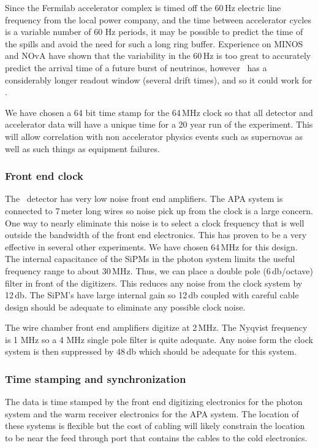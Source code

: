 Since the Fermilab accelerator complex is timed off the 60\,Hz electric
line frequency from the local power company, and the time between
accelerator cycles is a variable number of 60 Hz periods, it may be
possible to predict the time of the spills and avoid the need for such
a long ring buffer.  Experience on MINOS and NOvA have shown that the
variability in the 60\,Hz is too great to accurately predict the
arrival time of a future burst of neutrinos, however \LBNE\ has a
considerably longer readout window (several drift times), and so it
could work for \LBNE.

We have chosen a 64 bit time stamp for the 64\,MHz clock so that all
detector and accelerator data will have a unique time for a 20 year
run of the experiment.  This will allow correlation with non
accelerator physics events such as supernovas as well as such things
as equipment failures.

\subsubsection{Front end clock}

The \LBNE\ detector has very low noise front end amplifiers.  The APA system
is connected to 7\,meter long wires so noise pick up from the clock is
a large concern.  One way to nearly eliminate this noise is to select
a clock frequency that is well outside the bandwidth of the front end
electronics.  This has proven to be a very effective in several other
experiments.  We have chosen 64\,MHz for this design.  The internal
capacitance of the SiPMs in the photon system limits the useful
frequency range  to about 30\,MHz.  Thus, we can place a double pole (6\,db/octave) filter in front of the digitizers. This reduces any noise
from the clock system by 12\,db.  The SiPM's have large internal gain
so 12\,db coupled with careful cable design should be adequate to
eliminate any possible clock noise.

The wire chamber front end amplifiers digitize at 2\,MHz.  The Nyqvist
frequency is 1 MHz so a 4 MHz single pole filter is quite adequate.
Any noise form the clock system is then suppressed by 48\,db which
should be adequate for this system.

\subsubsection{Time stamping and synchronization}

The data is time stamped by the front end digitizing electronics for
the photon system and the warm receiver electronics for the APA
system.  The location of these systems is flexible but the cost of
cabling will likely constrain the location to be near the feed through
port that contains the cables to the cold electronics.

